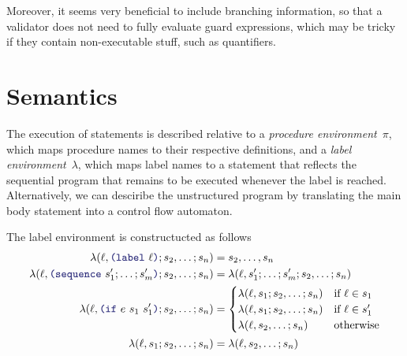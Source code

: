 \documentclass[runningheads]{llncs}
\begin{document}
Moreover, it seems very beneficial to include branching information,
so that a validator does not need to fully evaluate guard expressions,
which may be tricky if they contain non-executable stuff, such as quantifiers.

\section{Semantics}

The execution of statements is described relative to
a \emph{procedure environment}~$\pi$,
which maps procedure names to their respective definitions,
and a \emph{label environment}~$\lambda$,
which maps label names to a statement that reflects
the sequential program that remains to be executed
whenever the label is reached.
Alternatively, we can desciribe the unstructured program
by translating the main body statement into a control flow automaton.

The label environment is constructucted as follows
\begin{align*}
\lambda(\ell,\LP \terminal{label}~ \ell \RP; s_2,\dots; s_n)
    &= s_2,\dots,s_n \\
\lambda(\ell,\LP \terminal{sequence}~ s'_1; \dots; s'_m \RP; s_2,\dots; s_n)
    &= \lambda(\ell, s'_1; \dots; s'_m; s_2,\dots; s_n) \\
\lambda(\ell,\LP \terminal{if}~e~s_1~s'_1 \RP; s_2,\dots; s_n)
    &= \begin{cases}
       \lambda(\ell, s_1; s_2,\dots; s_n) & \text{if } \ell \in s_1 \\
       \lambda(\ell, s_1; s_2,\dots; s_n) & \text{if } \ell \in s'_1 \\
       \lambda(\ell, s_2,\dots; s_n) & \text{otherwise}
       \end{cases} \\
\lambda(\ell,s_1; s_2,\dots; s_n)
    &= \lambda(\ell, s_2,\dots; s_n) \\
\end{align*}
\end{document}
